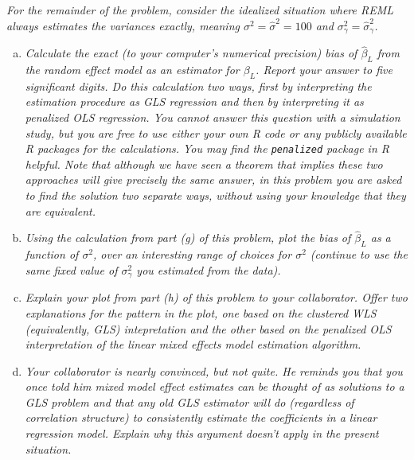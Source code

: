 \documentclass[11pt, letterpaper]{article}
\begin{document}
{\em For the remainder of the problem, consider the idealized situation where REML always estimates the variances
exactly, meaning $\sigma^2=\hat{\sigma}^2=100$ and $\sigma^2_\gamma=\hat{\sigma}^2_\gamma$.}
\begin{enumerate}[(a)]
\addtocounter{enumi}{6}
\item {\em Calculate the exact (to your computer's numerical precision) bias of $\hat{\beta}_L$ from the random effect model as an estimator for $\beta_L$.  Report your answer to five significant digits.  Do this calculation two ways, first by interpreting the estimation procedure as GLS regression and then by interpreting it as penalized OLS regression.   You cannot answer this question with a simulation study, but you are free to use either your own R code or any publicly available R packages for the calculations.  You may find the 
\texttt{penalized} package in R helpful.  Note that although we have seen a theorem that implies these two approaches will give precisely the same answer, in this
problem you are asked to find the solution two separate ways, without using your knowledge that they are equivalent.  }
\item  {\em Using the calculation from part (g) of this problem, plot the bias of $\hat{\beta}_L$ as
a function of $\sigma^2$, over an interesting range of choices for $\sigma^2$ (continue to use the same fixed value
of $\sigma^2_\gamma$ you estimated from the data).}
\item {\em Explain your plot from part (h) of this problem to your collaborator.  Offer two explanations for the pattern in the plot, one based on the clustered WLS (equivalently, GLS) intepretation and the other based on the penalized OLS interpretation of the linear mixed effects model estimation algorithm.}
\item {\em Your collaborator is nearly convinced, but not quite.  He reminds you that you
once told him mixed model effect estimates can be thought of as solutions to a GLS problem and that
any old GLS estimator will do (regardless of correlation structure) to consistently estimate the 
coefficients in a linear regression model.  Explain why this argument doesn't apply in the present situation.}
\end{enumerate}
\end{document}
